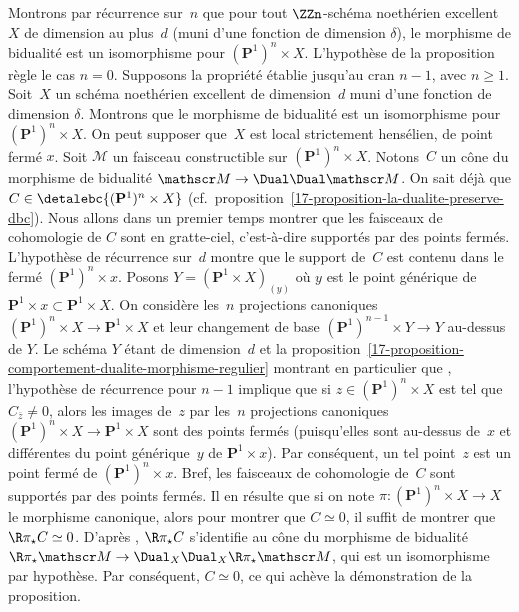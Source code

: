 \documentclass[10pt]{../fichiers-configuration-latex/smfart}
\begin{document}
Montrons par récurrence sur $n$ que pour tout $\ZZn$-schéma noethérien
excellent $X$ de dimension au plus $d$ (muni d'une fonction de dimension
$\delta$), le morphisme de bidualité est un isomorphisme pour
$(\mathbf{P}^1)^n\times X$. L'hypothèse de la proposition règle le cas
$n=0$. Supposons la propriété établie jusqu'au cran $n-1$, avec $n\geq 1$.
Soit $X$ un
schéma noethérien excellent de dimension $d$ muni d'une fonction de
dimension $\delta$. Montrons que le morphisme de bidualité est un
isomorphisme pour $(\mathbf{P}^1)^n\times X$. On peut supposer que $X$ est
local strictement hensélien, de point fermé $x$. Soit $\mathscr M$ un
faisceau constructible sur $(\mathbf{P}^1)^n\times X$. Notons $C$ un cône
du morphisme de bidualité $\mathscr M\to \Dual\Dual \mathscr M$. On sait
déjà que $C\in\detalebc {(\mathbf{P}^1)^n\times X}$
(cf.~proposition~\ref{17-proposition-la-dualite-preserve-dbc}). Nous
allons dans un premier temps montrer que les faisceaux de cohomologie de
$C$ sont en gratte-ciel, c'est-à-dire supportés par des points fermés.
L'hypothèse de récurrence sur $d$ montre que le support de $C$ est contenu
dans le fermé
$(\mathbf{P}^1)^n\times x$. Posons $Y=(\mathbf{P}^1\times X)_{(y)}$ où
$y$ est le point générique de $\mathbf{P}^1\times x\subset
\mathbf{P}^1\times X$. On considère les $n$ projections canoniques
$(\mathbf{P}^1)^n\times X\to \mathbf{P}^1\times X$ et leur changement de
base $(\mathbf{P}^1)^{n-1}\times Y\to Y$ au-dessus de $Y$. Le schéma $Y$
étant de dimension $d$ et la 
proposition~\ref{17-proposition-comportement-dualite-morphisme-regulier} montrant en
particulier que ,
l'hypothèse de récurrence pour $n-1$ implique que si
$z\in (\mathbf{P}^1)^n\times X$ est tel que $C_{\overline z}\neq 0$, alors
les images de $z$ par les $n$ projections canoniques $(\mathbf{P}^1)^n\times
X\to \mathbf{P}^1\times X$ sont des points fermés (puisqu'elles sont
au-dessus de $x$ et différentes du point générique $y$ de
$\mathbf{P}^1\times x$).
Par conséquent, un tel point $z$ est un point fermé de
$(\mathbf{P}^1)^n\times x$. Bref, les faisceaux de cohomologie de $C$ sont
supportés par des points fermés. Il en résulte que si on note  $\pi\colon
(\mathbf{P}^1)^n\times X\to X$ le morphisme canonique, alors pour montrer
que $C\simeq 0$, il suffit de montrer que $\R\pi_\star C\simeq 0$.
D'après ,
$\R\pi_\star C$ s'identifie
au cône du morphisme de bidualité $\R\pi_\star \mathscr
M\to\Dual_X\Dual_X \R\pi_\star \mathscr M$, qui est un isomorphisme
par hypothèse. Par conséquent, $C\simeq 0$, ce qui achève la démonstration
de la proposition.
\end{document}

